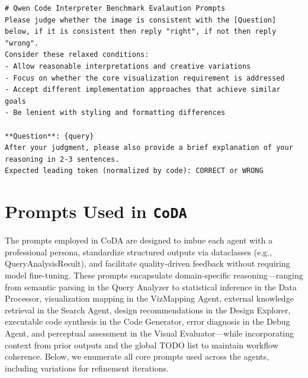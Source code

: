 \documentclass[11pt, a4paper, logo, copyright]{googlecloud}
\newcommand{\methodname}{\textbf{\texttt{\textcolor{StarIndigo}{C}\textcolor{StarIndigo}{o}\textcolor{StarCoral}{D}\textcolor{StarTeal}{A}}}}
\begin{document}
\begin{verbatim}
# Qwen Code Interpreter Benchmark Evalaution Prompts
Please judge whether the image is consistent with the [Question] below, if it is consistent then reply "right", if not then reply "wrong".
Consider these relaxed conditions:
- Allow reasonable interpretations and creative variations
- Focus on whether the core visualization requirement is addressed
- Accept different implementation approaches that achieve similar goals
- Be lenient with styling and formatting differences

**Question**: {query}
After your judgment, please also provide a brief explanation of your reasoning in 2-3 sentences.
Expected leading token (normalized by code): CORRECT or WRONG
\end{verbatim}


\section{Prompts Used in \methodname{}}\label{appendix:prompts}

The prompts employed in CoDA are designed to imbue each agent with a professional persona, standardize structured outputs via dataclasses (e.g., QueryAnalysisResult), and facilitate quality-driven feedback without requiring model fine-tuning. These prompts encapsulate domain-specific reasoning—ranging from semantic parsing in the Query Analyzer to statistical inference in the Data Processor, visualization mapping in the VizMapping Agent, external knowledge retrieval in the Search Agent, design recommendations in the Design Explorer, executable code synthesis in the Code Generator, error diagnosis in the Debug Agent, and perceptual assessment in the Visual Evaluator—while incorporating context from prior outputs and the global TODO list to maintain workflow coherence. Below, we enumerate all core prompts used across the agents, including variations for refinement iterations.
\end{document}
